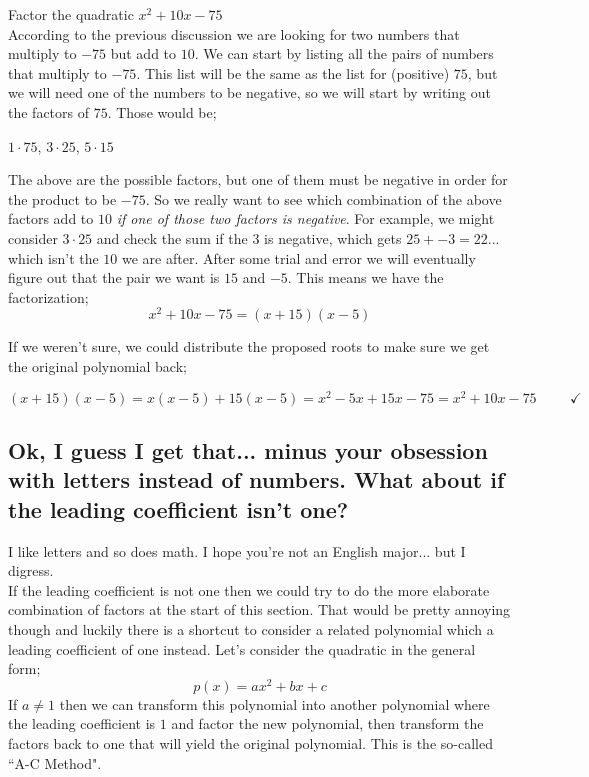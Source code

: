 \documentclass{ximeraXloud}
\begin{document}
        \begin{example}
            Factor the quadratic $x^2 + 10x - 75$\\
            
            According to the previous discussion we are looking for two numbers that multiply to $-75$ but add to $10$. We can start by listing all the pairs of numbers that multiply to $-75$. This list will be the same as the list for (positive) $75$, but we will need one of the numbers to be negative, so we will start by writing out the factors of $75$. Those would be;
            
            \begin{center}
                $1 \cdot 75$, \hspace{2cm} $3 \cdot 25$, \hspace{2cm} $5 \cdot 15$
            \end{center}
            
            The above are the possible factors, but one of them must be negative in order for the product to be $-75$. So we really want to see which combination of the above factors add to $10$ \textit{if one of those two factors is negative}. For example, we might consider $3 \cdot 25$ and check the sum if the $3$ is negative, which gets $25 + -3 = 22$...  which isn't the $10$ we are after. After some trial and error we will eventually figure out that the pair we want is $15$ and $-5$. This means we have the factorization;
            \[
                x^2 + 10x - 75 = (x + 15)(x - 5)
            \]
            
            If we weren't sure, we could distribute the proposed roots to make sure we get the original polynomial back;
            
            \[
                (x + 15)(x - 5) = x(x - 5) + 15(x - 5) = x^2 - 5x + 15x - 75 = x^2 + 10x - 75 \hspace{1cm} \checkmark
            \]
        \end{example}%
        
    \subsection*{Ok, I guess I get that... minus your obsession with letters instead of numbers. What about if the leading coefficient isn't one?}
        I like letters and so does math. I hope you're not an English major... but I digress.\\
        If the leading coefficient is not one then we could try to do the more elaborate combination of factors at the start of this section. That would be pretty annoying though and luckily there is a shortcut to consider a related polynomial which a leading coefficient of one instead. Let's consider the quadratic in the general form;
        \[
            p(x) = ax^2 + bx + c
        \]
        If $a \neq 1$ then we can transform this polynomial into another polynomial where the leading coefficient is $1$ and factor the new polynomial, then transform the factors back to one that will yield the original polynomial. This is the so-called ``A-C Method".
        
\end{document}
